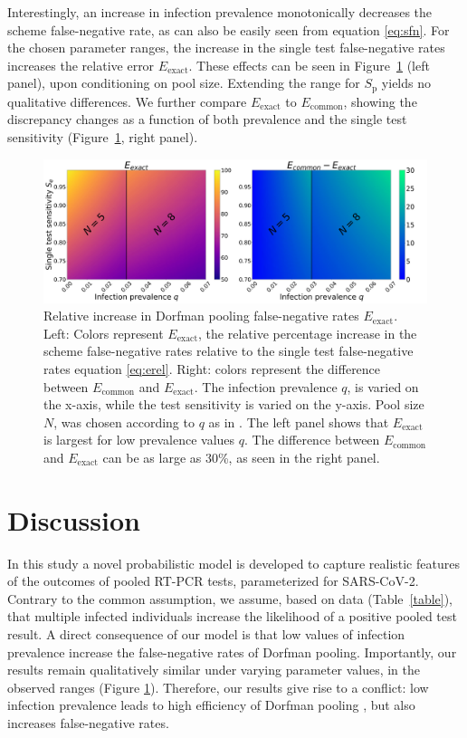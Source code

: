 \documentclass{article}
\newcommand{\Sp}{S_\text{p}}
\newcommand{\err}[1]{E_{\text{{#1}}}}%
\begin{document}
Interestingly, an increase in infection prevalence monotonically
decreases the scheme false-negative rate, as can also be easily seen
from equation \eqref{eq:sfn}. For the chosen parameter ranges, the
increase in the single test false-negative rates increases the
relative error $\err{exact}$. These effects can be seen in
Figure~\ref{fig1} (left panel), upon conditioning on pool
size. Extending the range for $\Sp$ yields no qualitative
differences. We further compare $\err{exact}$ to $\err{common}$,
showing the discrepancy changes as a function of both prevalence and
the single test sensitivity (Figure~\ref{fig1}, right panel).
\begin{figure}[H]
  \centering
  \includegraphics[width=\textwidth]{heatmap_sfn.jpg}
  \caption{Relative increase in Dorfman pooling false-negative rates
    $\err{exact}$. Left: Colors represent $\err{exact}$, the relative
    percentage increase in the scheme false-negative rates relative to
    the single test false-negative rates equation \eqref{eq:erel}. Right:
    colors represent the difference between $\err{common}$ and
    $\err{exact}$. The infection prevalence $q$, is varied on the
    x-axis, while the test sensitivity is varied on the y-axis. Pool
    size $N$, was chosen according to $q$ as in
    \cite{DorfmanYuvalDor}. The left panel shows that $\err{exact}$ is
    largest for low prevalence values $q$. The difference between
    $\err{common}$ and $\err{exact}$ can be as large as 30\%, as seen
    in the right panel.}\label{fig1}
\end{figure}

\section*{Discussion}
In this study a novel probabilistic model is developed to capture
realistic features of the outcomes of pooled RT-PCR tests,
parameterized for SARS-CoV-2. Contrary to the common assumption, we
assume, based on data (Table~\ref{table}), that multiple infected
individuals increase the likelihood of a positive pooled test
result. A direct consequence of our model is that low values of
infection prevalence increase the false-negative rates of Dorfman
pooling. Importantly, our results remain qualitatively similar under
varying parameter values, in the observed ranges
\cite{KitComparison,EstimatingRatesKucrika, EstimatingRatesLourenco,
  InterpretingCOVID19Test} (Figure \ref{fig1}). Therefore, our results
give rise to a conflict: low infection prevalence leads to high
efficiency of Dorfman pooling \cite{DorfmanYuvalDor}, but also
increases false-negative rates.
\end{document}
